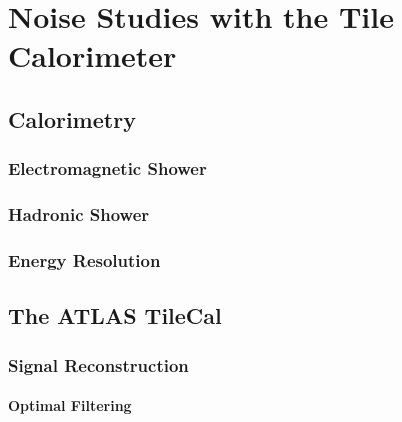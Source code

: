 \documentclass[10pt,twoside,cucitura,classica,english,openany]{toptesi}
\begin{document}


\chapter{Noise Studies with the Tile Calorimeter}
\label{cha:noise-studies-with}

\section{Calorimetry}
\label{sec:calorimetry}



\subsection{Electromagnetic Shower}
\label{sec:electr-show}



\subsection{Hadronic Shower}
\label{sec:hadronic-shower}



\subsection{Energy Resolution}
\label{sec:energy-resolution}



\section{The ATLAS TileCal}
\label{sec:atlas-tilecal}



\subsection{Signal Reconstruction}
\label{sec:sign-reconstr}



\subsubsection{Optimal Filtering}
\label{sec:optimal-filtering}


\end{document}

